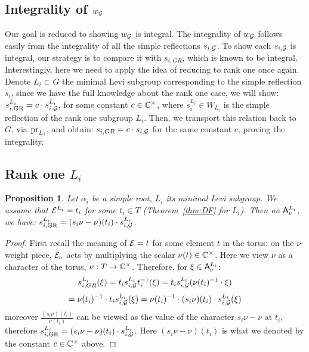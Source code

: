 \documentclass{article}
\theoremstyle{plain}
\newtheorem{proposition}[theorem]{Proposition}
\theoremstyle{definition}
\theoremstyle{remark}
\numberwithin{equation}{section}
\begin{document}
\subsection*{Integrality of $w_\mathcal G$}
Our goal is reduced to showing $w_\mathcal G$ is integral. The integrality of $w_\mathcal G$ follows easily from the integrality of all the simple reflections $s_{i,\mathcal G}$. To show each $s_{i,\mathcal G}$ is integral, our strategy is to compare it with $s_{i,GR}$, which is known to be integral. Interestingly, here we need to apply the idea of reducing to rank one once again. Denote $L_i \subset G$ the minimal Levi subgroup corresponding to the simple reflection $s_i$, since we have the full knowledge about the rank one case, we will show: $s_{i,\mathrm{GR}}^{L_i} = c\cdot s_{i,\mathcal G}^{L_i}$, for some constant $c \in \mathbb{C}^\times$, where $s_i^{L_i} \in  W_{L_i}$ is the simple reflection of the rank one subgroup $L_i$. Then, we transport this relation back to $G$, via $\operatorname{pr}_{L_i}$, and obtain: $s_{i,GR} = c\cdot s_{i,\mathcal G}$ for the same constant $c$, proving the integrality.

\subsection*{Rank one $L_i$}
\begin{proposition}\label{prop:W-step}
Let $\alpha_i$ be a simple root, $L_i$ its minimal Levi subgroup. We assume that $\mathcal E^{L_i}=t_i$ for some $t_i\in T$ (Theorem~\ref{thm:DF} for $L_i$). Then on $\mathsf A_\nu^{L_i}$, we have: $s_{i,\mathrm{GR}}^{L_i}=(s_i\nu-\nu)(t_i)\cdot s_{i,\mathcal G}^{L_i}$. 
\end{proposition}

\begin{proof}
First recall the meaning of $\mathcal E= t$ for some element $t$ in the torus: on the $\nu$-weight piece, $\mathcal E_\nu$ acts by multiplying the scalar $\nu(t) \in \mathbb{C}^\times$. Here we view $\nu$ as a character of the torus, $\nu : T \to \mathbb{C}^\times$. Therefore, for $\xi \in \mathsf A_\nu^{L_i}$:
\begin{equation*}
    s_{i,GR}^{L_i}(\xi) = t_i s_{i,\mathcal G}^{L_i} t_i^{-1} (\xi) = t_i s_{i,\mathcal G}^{L_i} (\nu(t_i)^{-1}\cdot\xi)
\end{equation*}
\begin{equation*}
    =\nu(t_i)^{-1} \cdot t_i s_{i,\mathcal G}^{L_i} (\xi) = \nu(t_i)^{-1} \cdot(s_i\nu)(t_i) \cdot  s_{i,\mathcal G}^{L_i}(\xi)
\end{equation*}
moreover $\frac{(s_i\nu)(t_i)}{\nu (t_i)}$ can be viewed as the value of the character $s_i \nu - \nu$ at $t_i$, therefore $s_{i,\mathrm{GR}}^{L_i}=(s_i\nu-\nu)(t_i)\cdot s_{i,\mathcal G}^{L_i}$. Here $(s_i\nu-\nu)(t_i)$ is what we denoted by the constant $c \in \mathbb{C}^\times$ above.
\end{proof}
\end{document}
